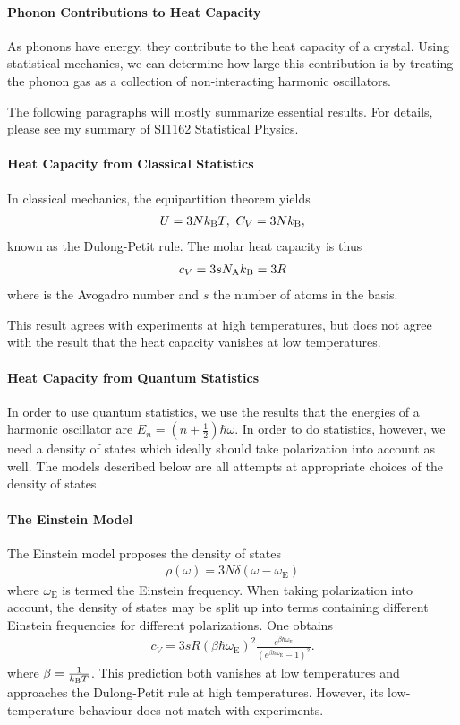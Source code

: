 \paragraph{Phonon Contributions to Heat Capacity}
As phonons have energy, they contribute to the heat capacity of a crystal. Using statistical mechanics, we can determine how large this contribution is by treating the phonon gas as a collection of non-interacting harmonic oscillators.

The following paragraphs will mostly summarize essential results. For details, please see my summary of SI1162 Statistical Physics.

\paragraph{Heat Capacity from Classical Statistics}
In classical mechanics, the equipartition theorem yields
\begin{align*}
	U = 3Nk_{\text{B}} T,\ C_{V} = 3Nk_{\text{B}}, 
\end{align*}
known as the Dulong-Petit rule. The molar heat capacity is thus
\begin{align*}
	c_{V} = 3sN_{\text{A}}k_{\text{B}} = 3R
\end{align*}
where \Na is the Avogadro number and $s$ the number of atoms in the basis.

This result agrees with experiments at high temperatures, but does not agree with the result that the heat capacity vanishes at low temperatures.

\paragraph{Heat Capacity from Quantum Statistics}
In order to use quantum statistics, we use the results that the energies of a harmonic oscillator are $E_{n} = \left(n + \frac{1}{2}\right)\hbar\omega$. In order to do statistics, however, we need a density of states which ideally should take polarization into account as well. The models described below are all attempts at appropriate choices of the density of states.

\paragraph{The Einstein Model}
The Einstein model proposes the density of states
\begin{align*}
	\rho(\omega) = 3N\delta(\omega - \omega_{\text{E}})
\end{align*}
where $\omega_{\text{E}}$ is termed the Einstein frequency. When taking polarization into account, the density of states may be split up into terms containing different Einstein frequencies for different polarizations. One obtains
\begin{align*}
	c_{V} = 3sR\left(\beta\hbar\omega_{\text{E}}\right)^{2}\frac{e^{\beta\hbar\omega_{\text{E}}}}{\left(e^{\beta\hbar\omega_{\text{E}}} - 1\right)^{2}}.
\end{align*}
where $\beta = \frac{1}{k_{\text{B}} T}$. This prediction both vanishes at low temperatures and approaches the Dulong-Petit rule at high temperatures. However, its low-temperature behaviour does not match with experiments.

